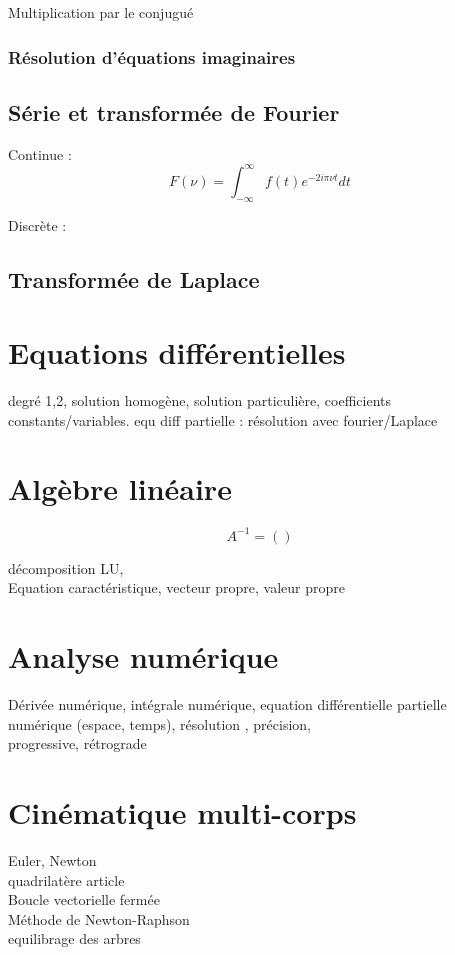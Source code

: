 \documentclass[12pt,a4paper,twoside]{article}
\numberwithin{equation}{subsection}
\begin{document}
Multiplication par le conjugué\\

\subsubsection{Résolution d'équations imaginaires}

\subsection{Série et transformée de Fourier}
Continue :
\begin{equation}
F(\nu)=\int_{-\infty}^{\infty} f(t) e^{-2 i \pi \nu t} dt
\end{equation}

Discrète : 

\subsection{Transformée de Laplace}

\newpage
\section{Equations différentielles}
degré 1,2, solution homogène, solution particulière,
coefficients constants/variables. 
equ diff partielle : résolution avec fourier/Laplace

\newpage
\section{Algèbre linéaire}
\begin{equation}
A^{-1}=()
\end{equation}

décomposition LU, \\
Equation caractéristique, vecteur propre, valeur propre

\newpage
\section{Analyse numérique}

Dérivée numérique, intégrale numérique, equation différentielle partielle numérique (espace, temps), résolution , précision, \\

progressive, rétrograde

\newpage
\section{Cinématique multi-corps}
Euler, Newton\\
quadrilatère article\\
Boucle vectorielle fermée\\
Méthode de Newton-Raphson\\
equilibrage des arbres\\
\newpage
\end{document}
